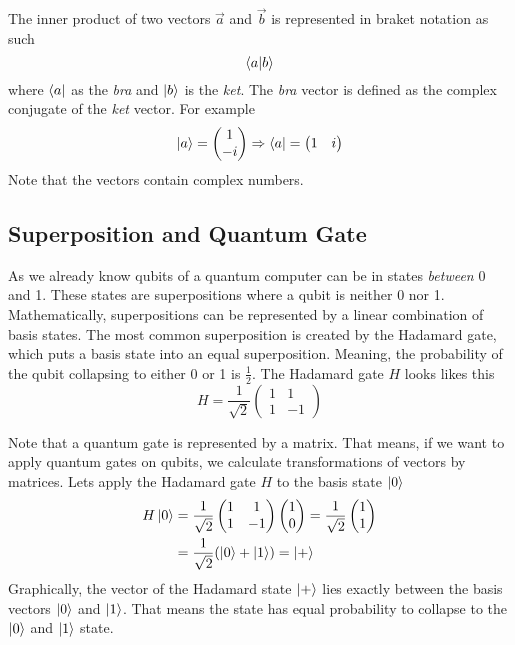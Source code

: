 The inner product of two vectors $\vec a$ and $\vec b$ is represented in braket notation as such 
\begin{equation}
    \braket{a | b}
\end{equation}
where $\bra a$ as the \textit{bra} and $\ket b$ is the \textit{ket}.
The \textit{bra} vector is defined as the complex conjugate of the \textit{ket} vector. 
For example
\begin{equation}
  \ket a=  \begin{pmatrix}1\\-i\end{pmatrix}  \Rightarrow \bra a = \begin{pmatrix}1 & i\end{pmatrix}
\end{equation}
Note that the vectors contain complex numbers.

\subsection{Superposition and Quantum Gate}
As we already know qubits of a quantum computer can be in states \textit{between} 0 and 1. 
These states are superpositions where a qubit is neither 0 nor 1.
Mathematically, superpositions can be represented by a linear combination of basis states. 
The most common superposition is created by the Hadamard gate, which puts a basis state into an equal superposition. 
Meaning, the probability of the qubit collapsing to either 0 or 1 is $\frac 1 2$.
The Hadamard gate $H$ looks likes this
\begin{equation}
    H = \frac{1}{\sqrt{2}} \begin{pmatrix}1 & 1\\ 1 & -1\end{pmatrix}  
\end{equation}

Note that a quantum gate is represented by a matrix.
That means, if we want to apply quantum gates on qubits, we calculate transformations of vectors by matrices. 
Lets apply the Hadamard gate $H$ to the basis state $\ket 0$
\begin{equation}
   \begin{split}
   H \ket 0 &=  \frac{1}{\sqrt{2}} \begin{pmatrix}1 & 1\\ 1 & -1\end{pmatrix} \begin{pmatrix}1\\0\end{pmatrix}   
    =  \frac{1}{\sqrt{2}} \begin{pmatrix}1\\1\end{pmatrix}   \\
    &=  \frac{1}{\sqrt{2}} (\ket 0 + \ket 1)  = \ket +
   \end{split}
\end{equation}
Graphically, the vector of the Hadamard state $\ket +$ lies exactly between the basis vectors $\ket 0$ and $\ket 1$.
That means the state has equal probability to collapse to the $\ket 0$ and $\ket 1$ state.


